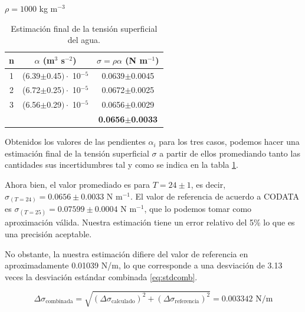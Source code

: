 \begin{table}[H]
	\centering
	\begin{minipage}{0.7\textwidth} 
		\centering
		$\rho = 1000$ kg m$^{-3}$\\
		\begin{tabular}{|c|c|c|}
			\toprule
			n & $\alpha$ (m$^3$ s$^{-2}$) & $\sigma=\rho\alpha$ (N m$^{-1}$) \\
			\hline
			1 & (6.39$\pm$0.45$)\cdot$ 10$^{-5}$ & 0.0639$\pm$0.0045  \\
			2 & (6.72$\pm$0.25$)\cdot$ 10$^{-5}$ & 0.0672$\pm$0.0025  \\
			3 & (6.56$\pm$0.29$)\cdot$ 10$^{-5}$ & 0.0656$\pm$0.0029  \\
			\hline
			\cellcolor{gray} & \cellcolor{gray}  & \textbf{0.0656$\pm$0.0033}    \\
			\bottomrule
		\end{tabular}
		\caption{\footnotesize Estimación final de la tensión superficial del agua.}
		\label{tab:sigmas}
	\end{minipage}
\end{table}


Obtenidos los valores de las pendientes $\alpha_i$ para los tres casos, podemos hacer una estimación final de la tensión superficial $\sigma$ a partir de ellos promediando tanto las cantidades sus incertidumbres tal y como se indica en la tabla \ref{tab:sigmas}.

\vspace{\baselineskip}

Ahora bien, el valor promediado  es para $T=24\pm1$, es decir, $\sigma_{(T=24)} = 0.0656\pm0.0033$ N m$^{-1}$. El valor de referencia de acuerdo a CODATA \cite{Vargaftik1983} es $\sigma_{(T=25)} = 0.07599\pm0.0004$ N m$^{-1}$, que lo podemos tomar como aproximación válida. Nuestra estimación tiene un error relativo del 5\% lo que es una precisión aceptable.

\vspace{\baselineskip}

No obstante, la  nuestra estimación difiere del valor de referencia en aproximadamente 0.01039 N/m, lo que corresponde a una desviación de 3.13 veces la desviación estándar combinada \ref{eq:stdcomb}.

\vspace{\baselineskip}
\begin{equation}\label{eq:stdcomb}
	\Delta \sigma_\text{combinada}= \sqrt{(\Delta \sigma_\text{calculado})^2 + (\Delta \sigma_\text{referencia})^2} = 0.003342 \text{ N/m}
\end{equation}

